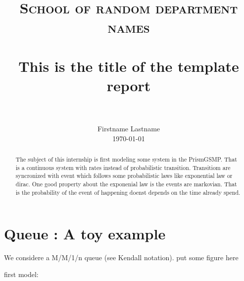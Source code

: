 \documentclass[paper=a4, fontsize=11pt]{scrartcl}
\title{
		\usefont{OT1}{bch}{b}{n}
		\normalfont \normalsize \textsc{School of random department names} \\ [25pt]
		\horrule{0.5pt} \\[0.4cm]
		\huge This is the title of the template report \\
		\horrule{2pt} \\[0.5cm]
}
\author{
		\normalfont 								\normalsize
        Firstname Lastname\\[-3pt]		\normalsize
        \today
}
\date{}
\numberwithin{equation}{section}		%
\numberwithin{figure}{section}			%
\numberwithin{table}{section}				%
\begin{document}
\maketitle
\begin{abstract}
	The subject of this internship is first modeling some system  in the PrismGSMP. That is a continuous system with rates instead of probabilistic transition. Transitiom are syncronized with event which follows some probabilistic laws like exponential law or dirac. One good property about the exponenial law is the events are markovian. That is the probability of the event of happening doenst depends on the time already spend.
	
\end{abstract}
\section{Queue : A toy example}
We considere a M/M/1/n queue (see Kendall notation). 
put some figure here 

first model:

\end{document}
